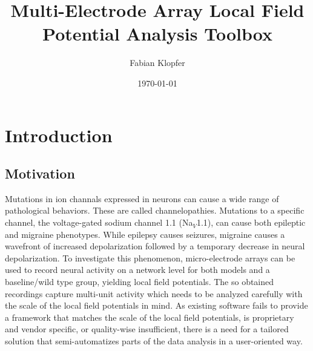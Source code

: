 \documentclass[11pt, twocolumn]{article}
\date{\today}
\author{Fabian Klopfer}
\title{Multi-Electrode Array Local Field Potential Analysis Toolbox}
\institute{Hertie Institute for Clincal Brain Research \\ University Hospital Tübingen}
\begin{document}
\thesistitlepage[language=english]

\restoregeometry
\rmfamily 
\normalsize

\section{Introduction}
    \subsection{Motivation}
        Mutations in ion channals expressed in neurons can cause a wide range of pathological behaviors.
        These are called channelopathies.
        Mutations to a specific channel, the voltage-gated sodium channel 1.1 (Na$_V$1.1), can cause both epileptic and migraine phenotypes.
        While epilepsy causes seizures, migraine causes a wavefront of increased depolarization followed by a temporary decrease in neural depolarization.
        To investigate this phenomenon, micro-electrode arrays can be used to record neural activity on a network level for both models and a baseline/wild type group, yielding local field potentials.
        The so obtained recordings capture multi-unit activity which needs to be analyzed carefully with the scale of the local field potentials in mind.
        As existing software fails to provide a framework that matches the scale of the local field potentials, is proprietary and vendor specific, or quality-wise insufficient, there is a need for a tailored solution that semi-automatizes parts of the data analysis in a user-oriented way. \\
\end{document}
